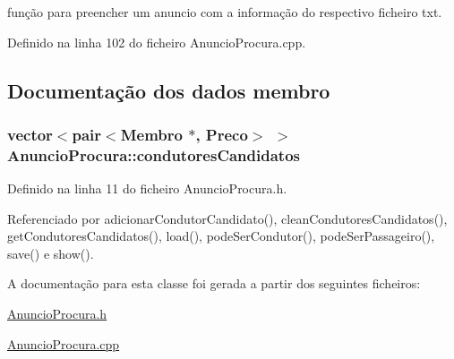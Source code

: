 função para preencher um anuncio com a informação do respectivo ficheiro txt. 



Definido na linha 102 do ficheiro Anuncio\+Procura.\+cpp.



\subsection{Documentação dos dados membro}
\hypertarget{class_anuncio_procura_a3e08d3fe714ffbff0434f5e3675a7601}{
\subsubsection[{condutores\+Candidatos}]{\setlength{\rightskip}{0pt plus 5cm}vector$<$pair$<${\bf Membro} $\ast$, {\bf Preco}$>$ $>$ Anuncio\+Procura\+::condutores\+Candidatos\hspace{0.3cm}{\ttfamily [private]}}}\label{class_anuncio_procura_a3e08d3fe714ffbff0434f5e3675a7601}


Definido na linha 11 do ficheiro Anuncio\+Procura.\+h.



Referenciado por adicionar\+Condutor\+Candidato(), clean\+Condutores\+Candidatos(), get\+Condutores\+Candidatos(), load(), pode\+Ser\+Condutor(), pode\+Ser\+Passageiro(), save() e show().



A documentação para esta classe foi gerada a partir dos seguintes ficheiros\+:\begin{DoxyCompactItemize}
\item 
\hyperlink{_anuncio_procura_8h}{Anuncio\+Procura.\+h}\item 
\hyperlink{_anuncio_procura_8cpp}{Anuncio\+Procura.\+cpp}\end{DoxyCompactItemize}
